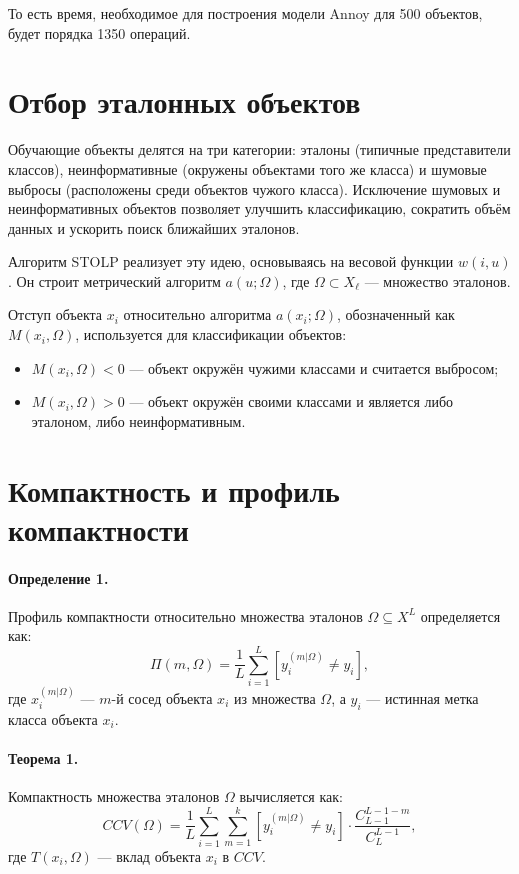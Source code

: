 То есть время, необходимое для построения модели Annoy для 500 объектов, будет порядка 1350 операций.

\section{Отбор эталонных объектов}
Обучающие объекты делятся на три категории: эталоны (типичные представители классов), неинформативные (окружены объектами того же класса) и шумовые выбросы (расположены среди объектов чужого класса). Исключение шумовых и неинформативных объектов позволяет улучшить классификацию, сократить объём данных и ускорить поиск ближайших эталонов.

Алгоритм STOLP реализует эту идею, основываясь на весовой функции \( w(i, u) \). Он строит метрический алгоритм \( a(u; \Omega) \), где \( \Omega \subset X_\ell \) — множество эталонов. 

Отступ объекта \( x_i \) относительно алгоритма \( a(x_i; \Omega) \), обозначенный как \( M(x_i, \Omega) \), используется для классификации объектов:
\begin{itemize}
    \item \( M(x_i, \Omega) < 0 \) — объект окружён чужими классами и считается выбросом;
    \item \( M(x_i, \Omega) > 0 \) — объект окружён своими классами и является либо эталоном, либо неинформативным.
\end{itemize}

\section{Компактность и профиль компактности}

\paragraph{Определение 1.} Профиль компактности относительно множества эталонов \( \Omega \subseteq X^L \) определяется как:
\[
\Pi(m, \Omega) = \frac{1}{L} \sum_{i=1}^L \left[ y_i^{(m|\Omega)} \neq y_i \right],
\]
где \( x_i^{(m|\Omega)} \) — \( m \)-й сосед объекта \( x_i \) из множества \( \Omega \), а \( y_i \) — истинная метка класса объекта \( x_i \).


\paragraph{Теорема 1.} Компактность множества эталонов \( \Omega \) вычисляется как:
\[
CCV(\Omega) = \frac{1}{L} \sum_{i=1}^L \sum_{m=1}^k \left[ y_i^{(m|\Omega)} \neq y_i \right] \cdot \frac{C_{L-1}^{L-1-m}}{C_L^{L-1}},
\]
где \( T(x_i, \Omega) \) — вклад объекта \( x_i \) в \( CCV \).


